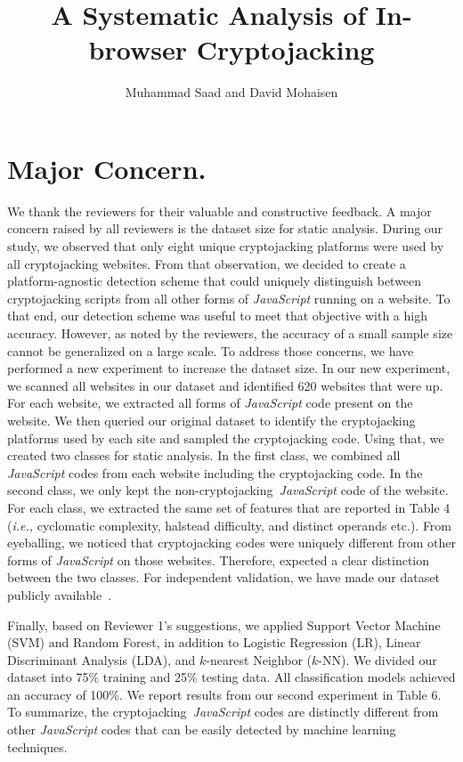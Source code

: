 \documentclass{abmart}
\title{A Systematic Analysis of In-browser Cryptojacking}
\author{Muhammad Saad and David Mohaisen}
\newcommand{\js}{{\em JavaScript}\xspace}
\newcommand{\etc}{{etc.}\xspace}
\newcommand{\ie}{{\em i.e.,}\xspace}
\newcommand{\cj}{cryptojacking\xspace}
\begin{document}
\maketitle

\section{Major Concern.}

{\color{blue}We thank the reviewers for their valuable and constructive feedback. A major concern raised by all reviewers is the dataset size for static analysis. During our study, we observed that only eight unique \cj platforms were used by all \cj websites. From that observation, we decided to create a platform-agnostic detection scheme that could uniquely distinguish between \cj scripts from all other forms of \js running on a website. To that end, our detection scheme was useful to meet that objective with a high accuracy. However, as noted by the reviewers, the accuracy of a small sample size cannot be generalized on a large scale. To address those concerns, we have performed a new experiment to increase the dataset size. In our new experiment, we scanned all websites in our dataset and identified 620 websites that were up. For each website, we extracted all forms of \js code present on the website. We then queried our original dataset to identify the \cj platforms used by each site and sampled the \cj code. Using that, we created two classes for static analysis. In the first class, we combined all \js codes from each website including the \cj code. In the second class, we only kept the non-\cj~\js code of the website. For each class, we extracted the same set of features that are reported in Table 4 (\ie cyclomatic complexity, halstead difficulty, and distinct operands \etc). From eyeballing, we noticed that \cj codes were uniquely different from other forms of \js on those websites. Therefore, expected a clear distinction between the two classes. For independent validation, we have made our dataset publicly available~\cite{Saad20}. 

Finally, based on Reviewer 1's suggestions, we applied Support Vector Machine (SVM) and Random Forest, in addition to Logistic Regression (LR), Linear Discriminant Analysis (LDA), and $k$-nearest Neighbor ($k$-NN). We divided our dataset into 75\% training and 25\% testing data. All classification models achieved an accuracy of 100\%. We report results from our second experiment in Table 6. To summarize, the \cj~\js codes are distinctly different from other \js codes that can be easily detected by machine learning techniques. }
\end{document}
